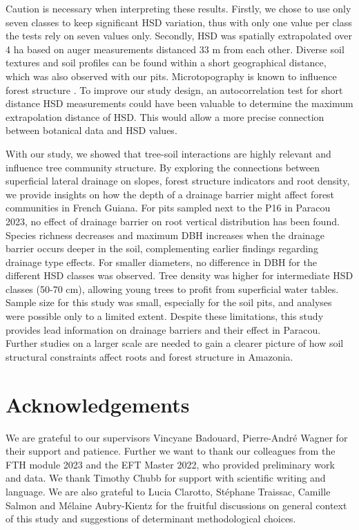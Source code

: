 \documentclass[fleqn,12pt]{latex/stylish_article} %
\begin{document}
Caution is necessary when interpreting these results. Firstly, we chose to use only seven classes to keep significant HSD variation, thus with only one value per class the tests rely on seven values only. Secondly, HSD was spatially extrapolated over 4 ha based on auger measurements distanced 33 m from each other. Diverse soil textures and soil profiles can be found within a short geographical distance, which was also observed with our pits. Microtopography is known to influence forest structure \citep{schwartzTopographyTraitsModulate2020}. To improve our study design, an autocorrelation test for short distance HSD measurements could have been valuable to determine the maximum extrapolation distance of HSD. This would allow a more precise connection between botanical data and HSD values.

With our study, we showed that tree-soil interactions are highly relevant and influence tree community structure. By exploring the connections between superficial lateral drainage on slopes, forest structure indicators and root density, we provide insights on how the depth of a drainage barrier might affect forest communities in French Guiana. For pits sampled next to the P16 in Paracou 2023, no effect of drainage barrier on root vertical distribution has been found. Species richness decreases and maximum DBH increases when the drainage barrier occurs deeper in the soil, complementing earlier findings regarding drainage type effects. For smaller diameters, no difference in DBH for the different HSD classes was observed. Tree density was higher for intermediate HSD classes (50-70 cm), allowing young trees to profit from superficial water tables. Sample size for this study was small, especially for the soil pits, and analyses were possible only to a limited extent. Despite these limitations, this study provides lead information on drainage barriers and their effect in Paracou. Further studies on a larger scale are needed to gain a clearer picture of how soil structural constraints affect roots and forest structure in Amazonia.

\hypertarget{acknowledgements}{%
\section{Acknowledgements}\label{acknowledgements}}

We are grateful to our supervisors Vincyane Badouard, Pierre-André Wagner for their support and patience. Further we want to thank our colleagues from the FTH module 2023 and the EFT Master 2022, who provided preliminary work and data. We thank Timothy Chubb for support with scientific writing and language. We are also grateful to Lucia Clarotto, Stéphane Traissac, Camille Salmon and Mélaine Aubry-Kientz for the fruitful discussions on general context of this study and suggestions of determinant methodological choices.
\end{document}

